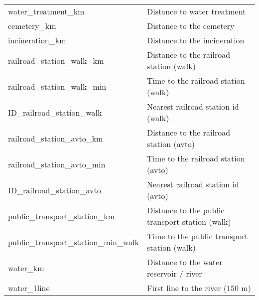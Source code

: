 \begin{longtable}[c]{ll}
    water\_treatment\_km                       & Distance to water treatment                                                                                               \\
    cemetery\_km                               & Distance to the cemetery                                                                                                  \\
    incineration\_km                           & Distance to the incineration                                                                                              \\
    railroad\_station\_walk\_km                & Distance to the railroad station (walk)                                                                                   \\
    railroad\_station\_walk\_min               & Time to the railroad station (walk)                                                                                       \\
    ID\_railroad\_station\_walk                & Nearest railroad station id (walk)                                                                                        \\
    railroad\_station\_avto\_km                & Distance to the railroad station (avto)                                                                                   \\
    railroad\_station\_avto\_min               & Time to the railroad station (avto)                                                                                       \\
    ID\_railroad\_station\_avto                & Nearest railroad station id (avto)                                                                                        \\
    public\_transport\_station\_km             & Distance to the public transport station (walk)                                                                           \\
    public\_transport\_station\_min\_walk      & Time to the public transport station (walk)                                                                               \\
    water\_km                                  & Distance to the water reservoir / river                                                                                   \\
    water\_1line                               & First line to the river (150 m)                                                                                           \\

\end{longtable}
